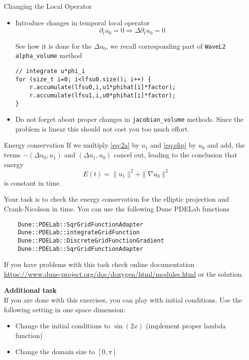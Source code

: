 \documentclass[12pt,a4paper]{article}
\begin{document}
\begin{Exercise}{Changing the Local Operator}
\begin{itemize}
\item Introduce changes in temporal local operator
 $$ \partial_t u_0  = 0 \Rightarrow \Delta \partial_t u_0= 0$$

See how it is done for the $\Delta u_0$, we recall corresponding part of \lstinline{WaveL2} \\ \lstinline{alpha_volume} method
  \begin{lstlisting}
// integrate u*phi_i
for (size_t i=0; i<lfsu0.size(); i++) {
	r.accumulate(lfsu0,i,u1*phihat[i]*factor);
	r.accumulate(lfsu1,i,u0*phihat[i]*factor);
}
  \end{lstlisting}

\item Do not forget about proper changes in \lstinline{jacobian_volume} methods. Since the problem is linear this should not cost you too much effort.
\end{itemize}
\end{Exercise}
\begin{Exercise}{Energy conservation}
If we multiply \eqref{eq:2a} by $u_1$ and \eqref{eq:elip} by $u_0$ and add, the terms $-(\Delta u_0,u_1 )$ and $(\Delta u_1,u_0 )$ cancel out, leading to the conclusion that energy $$E(t) = \|u_1\|^2 + \| \nabla u_0\|^2 $$
is constant in time.


Your task is to check the energy conservation for the elliptic projection and Crank-Nicolson in time. You can use the following Dune PDELab functions
  \begin{lstlisting}
	Dune::PDELab::SqrGridFunctionAdapter
	Dune::PDELab::integrateGridFunction
	Dune::PDELab::DiscreteGridFunctionGradient
	Dune::PDELab::SqrGridFunctionAdapter  
  \end{lstlisting}

If you have problems with this task check online documentation
\url{https://www.dune-project.org/doc/doxygen/html/modules.html} or the solution.
\end{Exercise}

\textbf{Additional task}\\
If you are done with this exercises, you can play with initial conditions. Use the following setting in one space dimension:
\begin{itemize}
\item Change  the initial conditions to $\sin(2x)$ (implement proper lambda function)
\item Change the domain size to $[0,\pi]$
\end{itemize} 




\end{document}
